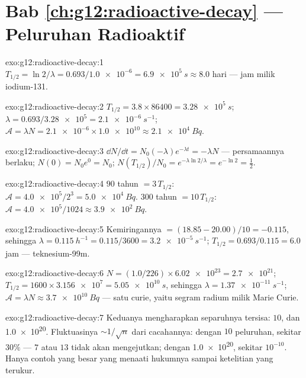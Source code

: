 \section*{Bab \ref{ch:g12:radioactive-decay} --- Peluruhan Radioaktif}

\begin{solution}{exo:g12:radioactive-decay:1}
$T_{1/2} = \ln 2/\lambda = 0.693/\num{1.0e-6} = \qty{6.9e5}{s}
\approx 8.0$ hari --- jam milik iodium-131.
\end{solution}

\begin{solution}{exo:g12:radioactive-decay:2}
$T_{1/2} = 3.8 \times \num{86400} = \qty{3.28e5}{s}$;
$\lambda = 0.693/\num{3.28e5} = \qty{2.1e-6}{s^{-1}}$;
$\mathcal A = \lambda N = \num{2.1e-6} \times \num{1.0e10} \approx
\qty{2.1e4}{Bq}$.
\end{solution}

\begin{solution}{exo:g12:radioactive-decay:3}
$\dd N/\dd t = N_0(-\lambda)e^{-\lambda t} = -\lambda N$ ---
persamaannya berlaku; $N(0) = N_0 e^0 = N_0$;
$N(T_{1/2})/N_0 = e^{-\lambda \ln 2/\lambda} = e^{-\ln 2} =
\tfrac12$.
\end{solution}

\begin{solution}{exo:g12:radioactive-decay:4}
$90$ tahun $= 3\,T_{1/2}$: $\mathcal A = \num{4.0e5}/2^3 =
\qty{5.0e4}{Bq}$. $300$ tahun $= 10\,T_{1/2}$:
$\mathcal A = \num{4.0e5}/1024 \approx \qty{3.9e2}{Bq}$.
\end{solution}

\begin{solution}{exo:g12:radioactive-decay:5}
Kemiringannya $= (18.85 - 20.00)/10 = -0.115$, sehingga
$\lambda = \qty{0.115}{h^{-1}} = 0.115/3600 = \qty{3.2e-5}{s^{-1}}$;
$T_{1/2} = 0.693/0.115 = 6.0$ jam --- teknesium-99m.
\end{solution}

\begin{solution}{exo:g12:radioactive-decay:6}
$N = (1.0/226) \times \num{6.02e23} = \num{2.7e21}$;
$T_{1/2} = 1600 \times \num{3.156e7} = \qty{5.05e10}{s}$, sehingga
$\lambda = \qty{1.37e-11}{s^{-1}}$;
$\mathcal A = \lambda N \approx \qty{3.7e10}{Bq}$ --- satu curie, yaitu
 segram radium milik Marie Curie.
\end{solution}

\begin{solution}{exo:g12:radioactive-decay:7}
Keduanya mengharapkan separuhnya tersisa: $10$, dan \num{1.0e20}. Fluktuasinya
$\sim 1/\sqrt{n}$ dari cacahannya: dengan $10$ peluruhan, sekitar $30\%$ ---
$7$ atau $13$ tidak akan mengejutkan; dengan \num{1.0e20}, sekitar
$10^{-10}$. Hanya contoh yang besar yang menaati hukumnya sampai ketelitian
yang terukur.
\end{solution}

